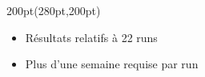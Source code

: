 \begin{frame}

\begin{textblock*}{200pt}(280pt,200pt)
\scriptsize
\begin{itemize}
 \item[$\bullet$] R\'esultats relatifs \`a 22 runs
 \item[$\bullet$] Plus d'une semaine requise par run
\end{itemize}
\end{textblock*}

\end{frame}


